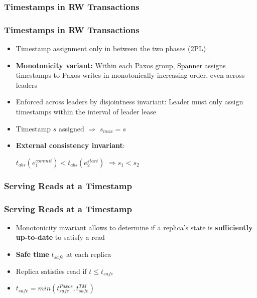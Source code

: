 \documentclass{beamer}
\begin{document}
\subsubsection{Timestamps in RW Transactions}
\begin{frame}
  \frametitle{Timestamps in RW Transactions}
  \begin{itemize}
    \item{Timestamp assignment only in between the two phases (2PL)}
    \item{\textbf{Monotonicity variant:} \newline
      Within each Paxos group, Spanner assigns timestamps to Paxos writes in
      monotonically increasing order, even across leaders
    }
    \item{Enforced across leaders by disjointness invariant: \newline
      Leader must only assign timestamps within the interval of leader lease
    }
    \item{Timestamp $s$ assigned $\Rightarrow$ $s_{max} = s$}
    \item{\textbf{External consistency invariant}: \newline
      \begin{center}
        $t_{abs}\left(e^{commit}_1\right) < t_{abs}\left(e^{start}_2\right)$
        $\Rightarrow s_1 < s_2$
      \end{center}
    }
  \end{itemize}
\end{frame}

\subsubsection{Serving Reads at a Timestamp}
\begin{frame}
  \frametitle{Serving Reads at a Timestamp}
  \begin{itemize}
    \item{Monotonicity invariant allows to determine if a replica's state is
      \textbf{sufficiently up-to-date} to satisfy a read
    }
    \item{\textbf{Safe time} $t_{safe}$ at each replica}
    \item{Replica satisfies read if $t \leq t_{safe}$}
    \item{$t_{safe} = min\left(t^{Paxos}_{safe}, t^{TM}_{safe}\right)$}
  \end{itemize}
\end{frame}
\end{document}
